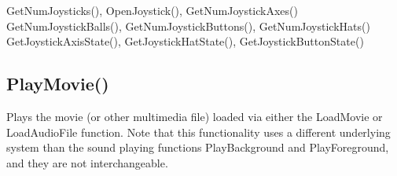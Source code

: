 \documentclass[letterpaper,10pt,english]{sphinxmanual}
\begin{document}
\sphinxAtStartPar
{}

\sphinxAtStartPar
GetNumJoysticks(), OpenJoystick(), GetNumJoystickAxes() GetNumJoystickBalls(), GetNumJoystickButtons(), GetNumJoystickHats() GetJoystickAxisState(), GetJoystickHatState(), GetJoystickButtonState()

\ignorespaces 

\subsection{PlayMovie()}
\label{\detokenize{reference/peblenvironment:playmovie}}\label{\detokenize{reference/peblenvironment:index-55}}
\sphinxAtStartPar
{}

\sphinxAtStartPar
{}

\sphinxAtStartPar
Plays the movie (or other multimedia file) loaded via either the LoadMovie or LoadAudioFile function.  Note that this functionality uses a  different underlying system than the sound playing functions PlayBackground and PlayForeground, and they are not interchangeable.

\sphinxAtStartPar
{}

\begin{sphinxVerbatim}[commandchars=\\\{\}]
\end{sphinxVerbatim}

\sphinxAtStartPar
{}

\begin{sphinxVerbatim}[commandchars=\\\{\}]
\end{sphinxVerbatim}
\end{document}
